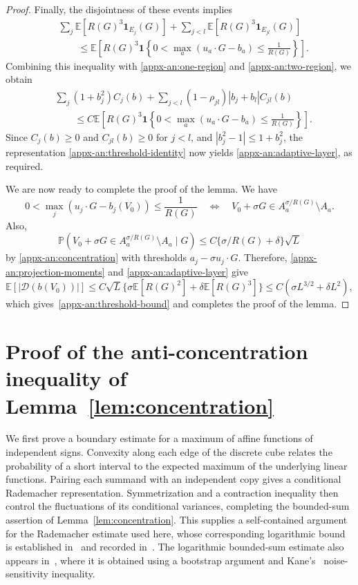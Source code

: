 \documentclass[11pt,letterpaper]{article}
\theoremstyle{remark}
\newcommand{\E}{\mathbb E}
\newcommand{\Pp}{\mathbb P}
\newcommand{\ind}{\mathbf 1}
\begin{document}
\begin{proof}
Finally, the disjointness of these events implies
\[
\begin{aligned}
&\sum_j\E[R(G)^3\ind_{E_j}(G)]
+\sum_{j<l}\E[R(G)^3\ind_{E_{jl}}(G)]\\
&\qquad\le
\E\left[
R(G)^3\ind\left\{
0<\max_a(u_a\cdot G-b_a)\le\frac1{R(G)}
\right\}\right].
\end{aligned}
\]
Combining this inequality with \eqref{appx-an:one-region}
and \eqref{appx-an:two-region}, we obtain
\[
\begin{aligned}
&\sum_j(1+b_j^2)C_j(b)
+\sum_{j<l}(1-\rho_{jl})|b_j+b_l|C_{jl}(b)\\
&\qquad\le C\E\left[
R(G)^3\ind\left\{
0<\max_a(u_a\cdot G-b_a)\le\frac1{R(G)}
\right\}\right].
\end{aligned}
\]
Since \(C_j(b)\ge0\) and \(C_{jl}(b)\ge0\) for \(j<l\), and
\(|b_j^2-1|\le1+b_j^2\), the representation
\eqref{appx-an:threshold-identity} now yields
\eqref{appx-an:adaptive-layer}, as required.


We are now ready to complete the proof of the lemma. We have
$$
0<\max_j(u_j\cdot G-b_j(V_0))
 \le\frac1{R(G)} \quad \Longleftrightarrow \quad V_0+\sigma G\in A_a^{\sigma/R(G)}\setminus A_a.
$$
Also,
$$
\Pp\left(V_0+\sigma G\in A_a^{\sigma/R(G)}\setminus A_a \mid G\right) \leq C\{\sigma/R(G)+\delta\}\sqrt L
$$
by \eqref{appx-an:concentration} with thresholds \(a_j-\sigma u_j\cdot G\). Therefore, \eqref{appx-an:projection-moments} and \eqref{appx-an:adaptive-layer}
give
\[
 \E[|\mathcal D(b(V_0))|]
 \le C\sqrt L\{\sigma\E[R(G)^2]+\delta\E[R(G)^3]\}
 \le C(\sigma L^{3/2}+\delta L^2),
\]
which gives~\eqref{appx-an:threshold-bound} and completes the proof of the lemma.
\end{proof}
\par\endgroup

\section{\texorpdfstring{Proof of the anti-concentration inequality of Lemma~\ref{lem:concentration}}{Proof of the rectangle anti-concentration inequality}}\label{appx-app:concentration}
\label{appx-conc:conditioning}

{
We first prove a boundary estimate for a maximum of affine functions
of independent signs. Convexity along each edge of the discrete cube
relates the probability of a short interval to the expected maximum
of the underlying linear functions. Pairing each summand with an
independent copy gives a conditional Rademacher representation.
Symmetrization and a contraction inequality then control the
fluctuations of its conditional variances, completing the bounded-sum
assertion of Lemma~\ref{lem:concentration}. This supplies a
self-contained argument for the Rademacher estimate used here,
whose corresponding logarithmic bound is established in~\cite{OST}
and recorded in~\cite[Lemma~J.4]{CCKK2022}. The logarithmic bounded-sum
estimate also appears in~\cite[Lemma~2.1]{AL}, where it is obtained
using a bootstrap argument and Kane's~\cite{Kane} noise-sensitivity
inequality.
}
\end{document}
